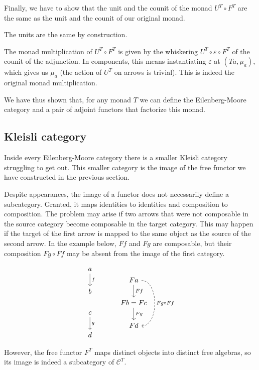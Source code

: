 \documentclass[DaoFP]{subfiles}
\begin{document}
Finally, we have to show that the unit and the counit of the monad $U^T \circ F^T$ are the same as the unit and the counit of our original monad.

The units are the same by construction.

The monad multiplication of $U^T \circ F^T$ is given by the whiskering $U^T \circ \varepsilon \circ F^T$ of the counit of the adjunction. In components, this means instantiating $\varepsilon$ at $(T a, \mu_a)$, which gives us $\mu_a$ (the action of $U^T$ on arrows is trivial). This is indeed the original monad multiplication.

We have thus shown that, for any monad $T$ we can define the Eilenberg-Moore category and a pair of adjoint functors that factorize this monad.

\subsection{Kleisli category}

Inside every Eilenberg-Moore category there is a smaller Kleisli category struggling to get out. This smaller category is the image of the free functor we have constructed in the previous section. 

Despite appearances, the image of a functor does not necessarily define a subcategory. Granted, it maps identities to identities and composition to composition. The problem may arise if two arrows that were not composable in the source category become composable in the target category. This may happen if the target of the first arrow is mapped to the same object as the source of the second arrow. In the example below, $F f$ and $F g$ are composable, but their composition $F g \circ F f$ may be absent from the image of the first category.


\[
 \begin{tikzcd}
 a
 \arrow[d, "f"]
 \\ b
 \\ c
 \arrow[d, "g"]
 \\ d
 \end{tikzcd}
  \hspace{30pt}
 \begin{tikzcd}
 F a
 \arrow[d, "F f"]
 \arrow[dd, dashed, bend left=90, "F g \circ F f"]
 \\ F b = F c
  \arrow[d, "F g"]
 \\ F d
 \end{tikzcd}
\]


However, the free functor $F^T$ maps distinct objects into distinct free algebras, so its image is indeed a subcategory of $\mathcal{C}^T$.
\end{document}
